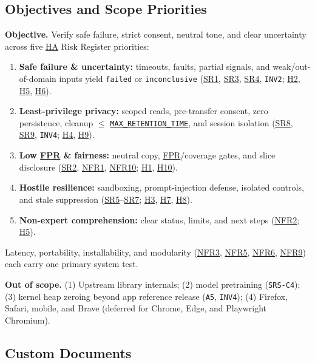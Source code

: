 \documentclass[12pt, titlepage]{article}
\newcommand{\MaxRetentionTime}{\hyperref[const:MAX_RETENTION_TIME]{\texttt{MAX\_\allowbreak{}RETENTION\_\allowbreak{}TIME}}}
\newcommand{\FPR}{\hyperlink{vnv-acr-fpr}{FPR}}
\newcommand{\HA}{\hyperlink{vnv-acr-ha}{HA}}
\begin{document}
\subsection{Objectives and Scope Priorities}\label{subsec:objectives}

\textbf{Objective.} Verify safe failure, strict consent, neutral tone, and clear uncertainty across five \HA{} Risk Register priorities:
\begin{enumerate}[leftmargin=*, itemsep=0.5pt, topsep=2pt]
    \item \textbf{Safe failure \& uncertainty:} timeouts, faults, partial signals, and weak/out-of-domain inputs yield \texttt{failed} or \texttt{inconclusive} (\hyperref[req:SR1]{SR1}, \hyperref[req:SR3]{SR3}, \hyperref[req:SR4]{SR4}, \texttt{INV2}; \hyperref[haz:H2]{H2}, \hyperref[haz:H5]{H5}, \hyperref[haz:H6]{H6}).
    \item \textbf{Least-privilege privacy:} scoped reads, pre-transfer consent, zero persistence, cleanup $\le$ \MaxRetentionTime{}, and session isolation (\hyperref[req:SR8]{SR8}, \hyperref[req:SR9]{SR9}, \texttt{INV4}; \hyperref[haz:H4]{H4}, \hyperref[haz:H9]{H9}).
    \item \textbf{Low \FPR{} \& fairness:} neutral copy, \FPR{}/coverage gates, and slice disclosure (\hyperref[req:SR2]{SR2}, \hyperref[req:NFR1]{NFR1}, \hyperref[req:NFR10]{NFR10}; \hyperref[haz:H1]{H1}, \hyperref[haz:H10]{H10}).
    \item \textbf{Hostile resilience:} sandboxing, prompt-injection defense, isolated controls, and stale suppression (\hyperref[req:SR5]{SR5}--\hyperref[req:SR7]{SR7}; \hyperref[haz:H3]{H3}, \hyperref[haz:H7]{H7}, \hyperref[haz:H8]{H8}).
    \item \textbf{Non-expert comprehension:} clear status, limits, and next steps (\hyperref[req:NFR2]{NFR2}; \hyperref[haz:H5]{H5}).
\end{enumerate}
Latency, portability, installability, and modularity (\hyperref[req:NFR3]{NFR3}, \hyperref[req:NFR5]{NFR5}, \hyperref[req:NFR6]{NFR6}, \hyperref[req:NFR9]{NFR9}) each carry one primary system test.

\textbf{Out of scope.} (1) Upstream library internals; (2) model pretraining (\texttt{SRS-C4}); (3) kernel heap zeroing beyond app reference release (\texttt{A5}, \texttt{INV4}); (4) Firefox, Safari, mobile, and Brave (deferred for Chrome, Edge, and Playwright Chromium).

\subsection{Custom Documents}\label{subsec:custom-docs}
\end{document}
